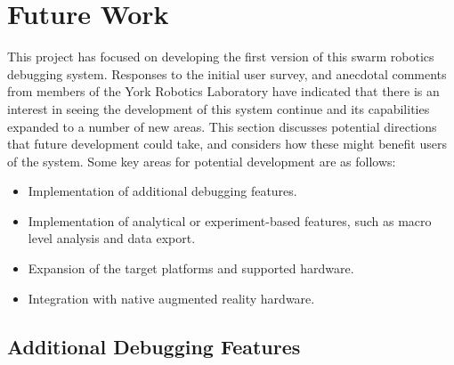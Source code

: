 
\chapter[Future Work]{Future Work} %

\label{Chapter11} %

This project has focused on developing the first version of this swarm robotics debugging system. Responses to the initial user survey, and anecdotal comments from members of the York Robotics Laboratory have indicated that there is an interest in seeing the development of this system continue and its capabilities expanded to a number of new areas. This section discusses potential directions that future development could take, and considers how these might benefit users of the system. Some key areas for potential development are as follows:

\begin{itemize}
 \item Implementation of additional debugging features.
 \item Implementation of analytical or experiment-based features, such as macro level analysis and data export.
 \item Expansion of the target platforms and supported hardware.
 \item Integration with native augmented reality hardware.
\end{itemize}


\section{Additional Debugging Features}




